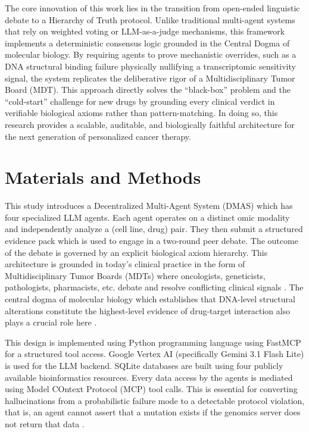\documentclass{article}
\begin{document}
The core innovation of this work lies in the transition from open-ended linguistic debate to a Hierarchy of Truth protocol. Unlike traditional multi-agent systems that rely on weighted voting or LLM-as-a-judge mechanisms, this framework implements a deterministic consensus logic grounded in the Central Dogma of molecular biology. By requiring agents to prove mechanistic overrides, such as a DNA structural binding failure physically nullifying a transcriptomic sensitivity signal, the system replicates the deliberative rigor of a Multidisciplinary Tumor Board (MDT). This approach directly solves the ``black-box'' problem and the ``cold-start'' challenge for new drugs by grounding every clinical verdict in verifiable biological axioms rather than pattern-matching. In doing so, this research provides a scalable, auditable, and biologically faithful architecture for the next generation of personalized cancer therapy.

\section{Materials and Methods}
\label{sec:methodology}

This study introduces a Decentralized Multi-Agent System (DMAS) which has four specialized LLM agents. Each agent operates on a distinct omic modality and independently analyze a (cell line, drug) pair. They then submit a structured evidence pack which is used to engage in a two-round peer debate. The outcome of the debate is governed by an explicit biological axiom hierarchy. This architecture is grounded in today's clinical practice in the form of Multidisciplinary Tumor Boards (MDTs) where oncologists, geneticists, pathologists, pharmacists, etc. debate and resolve conflicting clinical signals \cite{han2025multiagent, lorenzo2026evaluation}. The central dogma of molecular biology which establishes that DNA-level structural alterations constitute the highest-level evidence of drug-target interaction also plays a crucial role here \cite{han2025multiagent, liu2025multiomics}. 

This design is implemented using Python programming language using FastMCP for a structured tool access. Google Vertex AI (specifically Gemini 3.1 Flash Lite) is used for the LLM backend. SQLite databases are built using four publicly available bioinformatics resources. Every data access by the agents is mediated using Model COntext Protocol (MCP) tool calls. This is essential for converting hallucinations from a probabilistic failure mode to a detectable protocol violation, that is, an agent cannot assert that a mutation exists if the genomics server does not return that data \cite{flotho2026mcpmed, widjaja2025bioinfomcp}. 
\end{document}
